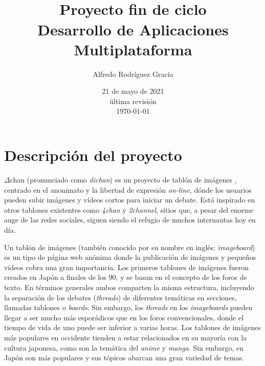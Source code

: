\documentclass[12pt,a4paper,titlepage]{article}
\title{\Dchan\\\bigskip\normalsize{Proyecto fin de ciclo\\Desarrollo de Aplicaciones Multiplataforma}}
\author{Alfredo Rodríguez Gracía}
\date{21 de mayo de 2021\\\bigskip\scriptsize{última revisión\\\today}}
\newcommand\Dchan{$\Delta$chan}
\begin{document}
    \maketitle
    \tableofcontents
    \newpage

    \section{Descripción del proyecto}




    {\Dchan} (pronunciado como \textit{dichan}) es un proyecto de tablón de imágenes \cite{wikiImageboard}, centrado en el anonimato y la libertad de expresión \textit{on-line}, dónde los usuarios pueden subir imágenes y vídeos cortos para iniciar un debate. Está inspirado en otros tablones existentes como \emph{4chan} y \emph{2channel}, sitios que, a pesar del enorme auge de las redes sociales, siguen siendo el refugio de muchos internautas hoy en día.

    Un tablón de imágenes (también conocido por su nombre en inglés: \textit{imageboard}) es un tipo de página web anónima donde la publicación de imágenes y pequeños vídeos cobra una gran importancia. Los primeros tablones de imágenes fueron creados en Japón a finales de los 90, y se basan en el concepto de los foros de texto. En términos generales ambos comparten la misma estructura, incluyendo la separación de los debates (\textit{threads}) de diferentes temáticas en secciones, llamadas tablones o \textit{boards}. Sin embargo, los \textit{threads} en los \textit{imageboards} pueden llegar a ser mucho más esporádicos que en los foros convencionales, donde el tiempo de vida de uno puede ser inferior a varias horas. Los tablones de imágenes más populares en occidente tienden a estar relacionados en su mayoría con la cultura japonesa, como son la temática del \emph{anime} y \emph{manga}. Sin embargo, en Japón son más populares y sus tópicos abarcan una gran variedad de temas.
\end{document}
